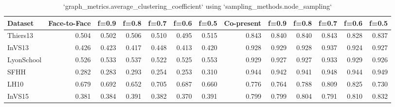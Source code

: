\begin{table}[ht]
\begin{tabular}{lrrrrrrrrrrrr}
\hline
 Dataset    &   Face-to-Face &   f=0.9 &   f=0.8 &   f=0.7 &   f=0.6 &   f=0.5 &   Co-present &   f=0.9 &   f=0.8 &   f=0.7 &   f=0.6 &   f=0.5 \\
\hline
 Thiers13   &          0.504 &   0.502 &   0.506 &   0.510 &   0.495 &   0.515 &        0.843 &   0.840 &   0.840 &   0.843 &   0.828 &   0.837 \\
 InVS13     &          0.426 &   0.423 &   0.417 &   0.448 &   0.413 &   0.420 &        0.928 &   0.929 &   0.928 &   0.937 &   0.924 &   0.927 \\
 LyonSchool &          0.526 &   0.533 &   0.537 &   0.522 &   0.525 &   0.553 &        0.929 &   0.927 &   0.927 &   0.933 &   0.929 &   0.926 \\
 SFHH       &          0.282 &   0.283 &   0.293 &   0.254 &   0.253 &   0.310 &        0.944 &   0.942 &   0.941 &   0.948 &   0.944 &   0.949 \\
 LH10       &          0.679 &   0.692 &   0.652 &   0.705 &   0.687 &   0.660 &        0.776 &   0.764 &   0.788 &   0.809 &   0.825 &   0.730 \\
 InVS15     &          0.381 &   0.384 &   0.391 &   0.382 &   0.370 &   0.391 &        0.799 &   0.799 &   0.804 &   0.791 &   0.810 &   0.832 \\
\hline
\end{tabular}
\caption{`graph_metrics.average_clustering_coefficient` using `sampling_methods.node_sampling`}
\end{table}